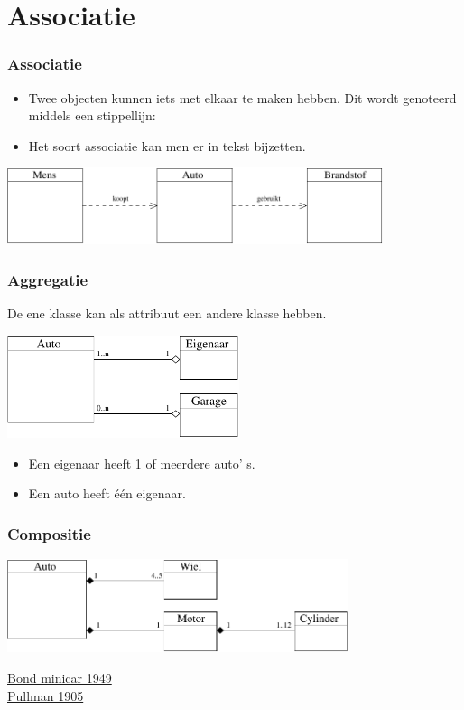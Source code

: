 \documentclass{beamer}
\begin{document}
\section{Associatie}

\begin{frame}\frametitle{Associatie}
  \begin{itemize}
  \item Twee objecten kunnen iets met elkaar te maken hebben. Dit wordt genoteerd middels een stippellijn:
  \item Het soort associatie kan men er in tekst bijzetten.
  \end{itemize}
\begin{center}
  \includegraphics[width=11cm]{asso}  
\end{center}
\end{frame}


\begin{frame}\frametitle{Aggregatie}
De ene klasse kan als attribuut een andere klasse hebben.
\vspace{0.5cm}
   \begin{center}
  \includegraphics[height=3cm]{aggr}  
\end{center}
\begin{itemize}
\item Een eigenaar heeft 1 of meerdere auto' s.
\item Een auto heeft \'e\'en eigenaar.
\end{itemize}
\end{frame}


\begin{frame}
\frametitle{Compositie}
\begin{center}
\includegraphics[width=10cm]{compo}
\end{center}
\href{http://en.wikipedia.org/wiki/Bond_Minicar}{Bond minicar 1949}\\
\href{http://en.wikipedia.org/wiki/Pullman_automobile}{Pullman 1905}
\end{frame}
\end{document}
